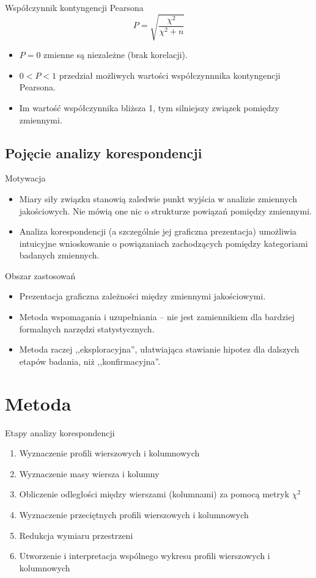 \documentclass{beamer}
\begin{document}
\begin{frame}{Współczynnik kontyngencji Pearsona}
  $$P = \sqrt{\frac{\chi^2}{\chi^2 +n}} $$
  \begin{itemize}
  \item $P = 0$ zmienne są niezależne (brak korelacji).
  \item $0 < P < 1$ przedział możliwych wartości współczynnnika kontyngencji Pearsona.
  \item Im wartość współczynnika bliższa 1, tym silniejszy związek pomiędzy zmiennymi.
  \end{itemize}
\end{frame}

\subsection{Pojęcie analizy korespondencji}
\begin{frame}{Motywacja}
  \begin{itemize}
  \item Miary siły związku stanowią zaledwie punkt wyjścia w analizie zmiennych jakościowych. Nie mówią one nic o strukturze powiązań pomiędzy zmiennymi.
  \item Analiza korespondencji (a szczególnie jej graficzna prezentacja) umożliwia intuicyjne wnioskowanie o powiązaniach zachodzących pomiędzy kategoriami badanych zmiennych.
  \end{itemize}
\end{frame}

\begin{frame}{Obszar zastosowań}
  \begin{itemize}
  \item Prezentacja graficzna zależności między zmiennymi jakościowymi.
  \item Metoda wspomagania i uzupełniania -- nie jest zamiennikiem dla bardziej formalnych narzędzi statystycznych.
   \item Metoda raczej ,,eksploracyjna'', ułatwiająca stawianie hipotez dla dalszych etapów badania, niż ,,konfirmacyjna''.
  \end{itemize}
\end{frame}

\section{Metoda}
\begin{frame}{Etapy analizy korespondencji}
  \begin{enumerate}
  \item Wyznaczenie profili wierszowych i kolumnowych
  \item Wyznaczenie masy wiersza i kolumny
  \item Obliczenie odległości między wierszami (kolumnami) za pomocą metryk $\chi^2$
  \item Wyznaczenie przeciętnych profili wierszowych i kolumnowych
  \item Redukcja wymiaru przestrzeni
  \item Utworzenie i interpretacja wspólnego wykresu profili wierszowych i kolumnowych
  \end{enumerate}
\end{frame}
\end{document}
